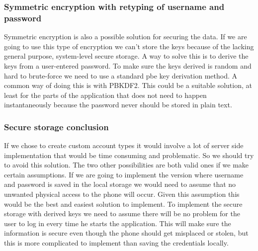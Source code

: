 \newpage

\subsubsection{Symmetric encryption with retyping of username and password}
Symmetric encryption is also a possible solution for securing the data. If we are going to use this type of encryption we can’t store the keys because of the lacking general purpose, system-level secure storage.
\newline
\newline
A way to solve this is to derive the keys from a user-entered password. To make sure the keys derived is random and hard to brute-force we need to use a standard \gls{pbe} key derivation method. A common way of doing this is with PBKDF2.
\newline
\newline
This could be a suitable solution, at least for the parts of the application that does not need to happen instantaneously because the password never should be stored in plain text.

\subsubsection{Secure storage conclusion}
If we chose to create custom account types it would involve a lot of server side implementation that would be time consuming and problematic. So we should try to avoid this solution. The two other possibilities are both valid ones if we make certain assumptions.
\newline
\newline
If we are going to implement the version where username and password is saved in the local storage we would need to assume that no unwanted physical access to the phone will occur. Given this assumption this would be the best and easiest solution to implement.
\newline
\newline
To implement the secure storage with derived keys we need to assume there will be no problem for the user to log in every time he starts the application. This will make sure the information is secure even though the phone should get misplaced or stolen, but this is more complicated to implement than saving the credentials locally.


